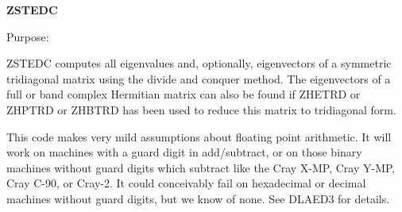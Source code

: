 {\bfseries Z\+S\+T\+E\+D\+C} 

 \begin{DoxyParagraph}{Purpose\+: }
\begin{DoxyVerb} ZSTEDC computes all eigenvalues and, optionally, eigenvectors of a
 symmetric tridiagonal matrix using the divide and conquer method.
 The eigenvectors of a full or band complex Hermitian matrix can also
 be found if ZHETRD or ZHPTRD or ZHBTRD has been used to reduce this
 matrix to tridiagonal form.

 This code makes very mild assumptions about floating point
 arithmetic. It will work on machines with a guard digit in
 add/subtract, or on those binary machines without guard digits
 which subtract like the Cray X-MP, Cray Y-MP, Cray C-90, or Cray-2.
 It could conceivably fail on hexadecimal or decimal machines
 without guard digits, but we know of none.  See DLAED3 for details.\end{DoxyVerb}
 
\end{DoxyParagraph}


